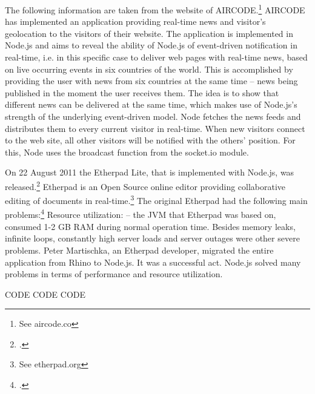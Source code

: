 \begin{appendices}
\begin{subappendices}
The following information are taken from the website of AIRCODE.\footnote{See aircode.co}
AIRCODE has implemented an application providing real-time news and visitor’s geolocation to the visitors of their website. The application is implemented in Node.js and aims to reveal the ability of Node.js of event-driven notification in real-time, i.e. in this specific case to deliver web pages with real-time news, based on live occurring events in six countries of the world. This is accomplished by providing the user with news from six countries at the same time – news being published in the moment the user receives them. The idea is to show that different news can be delivered at the same time, which makes use of Node.js’s strength of the underlying event-driven model.
Node fetches the news feeds and distributes them to every current visitor in real-time. When new visitors connect to the web site, all other visitors will be notified with the others’ position. For this, Node uses the broadcast function from the socket.io module.

On 22 August 2011 the Etherpad Lite, that is implemented with Node.js, was released.\footcite[Cf.][]{Martischka_2011}  Etherpad is an Open Source online editor providing collaborative editing of documents in real-time.\footnote{See etherpad.org} The original Etherpad had the following main problems:\footcite[Cf.][]{Martischka_2011} Resource utilization: – the JVM that Etherpad was based on, consumed 1-2 GB RAM during normal operation time. Besides memory leaks, infinite loops, constantly high server loads and server outages were other severe problems.
Peter Martischka, an Etherpad developer, migrated the entire application from Rhino to Node.js. It was a successful act. Node.js solved many problems in terms of performance and resource utilization. 



\label{appendix_meteor}
CODE CODE CODE

\end{subappendices}
\end{appendices}